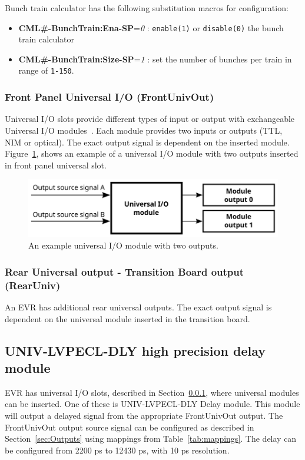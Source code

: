 \documentclass[12pt,a4paper]{article}
\begin{document}
\begin{itemize}
	Bunch train calculator has the following substitution macros for configuration:
	\begin{itemize}
	\item
	  \textbf{CML\#-BunchTrain:Ena-SP}=\emph{0} : \texttt{enable(1)} or \texttt{disable(0)} the bunch train calculator
	\item
	  \textbf{CML\#-BunchTrain:Size-SP}=\emph{1} : set the number of bunches per train in range of \texttt{1-150}.
	\end{itemize}
	
\end{itemize}


\subsubsection{Front Panel Universal I/O (FrontUnivOut)}\label{sec:Front Panel Universal I/O}
Universal I/O slots provide different types of input or output with exchangeable Universal I/O modules~\cite{mrf}. Each module provides two inputs or outputs (TTL, NIM or optical). 
The exact output signal is dependent on the inserted module. Figure~\ref{fig:output_univ}, shows an example of a universal I/O module with two outputs inserted in front panel universal slot.
\begin{figure}[H]
	\centering
	\includegraphics[]{./img/univ}
	\caption{An example universal I/O module with two outputs.}
	\label{fig:output_univ}
\end{figure}

\subsubsection{Rear Universal output - Transition Board output (RearUniv)}\label{sec:Rear Universal output}
An EVR has additional rear universal outputs. The exact output signal is dependent on the universal module inserted in the transition board.

\subsection{UNIV-LVPECL-DLY high precision delay module}\label{sec:UNIV-LVPECL-DLY}
EVR has universal I/O slots, described in Section~\ref{sec:Front Panel Universal I/O}, where universal modules can be inserted. One of these is UNIV-LVPECL-DLY Delay module. This module will output a delayed signal from the appropriate FrontUnivOut output. The FrontUnivOut output source signal can be configured as described in Section~\ref{sec:Outputs} using mappings from Table~\ref{tab:mappings}. The delay can be configured from 2200 ps to 12430 ps, with 10 ps resolution. 
\end{document}
